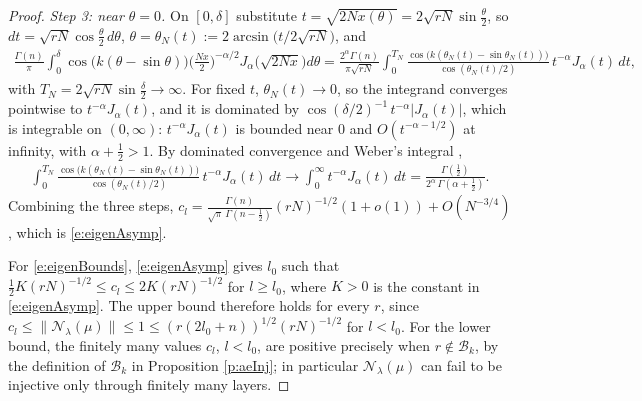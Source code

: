 \documentclass[11pt]{amsart}
\theoremstyle{plain}
\theoremstyle{definition}
\theoremstyle{remark}
\numberwithin{equation}{section}
\def\cB{\mathcal{B}}
\def\cN{\mathcal{N}}
\numberwithin{equation}{section}
\begin{document}
\begin{proof}
	\textit{Step 3: near $\theta=0$.} On $[0, \delta]$ substitute $t=\sqrt{2Nx(\theta)}=2\sqrt{rN}\sin\tfrac{\theta}{2}$, so $dt=\sqrt{rN}\cos\tfrac{\theta}{2}\,d\theta$, $\theta=\theta_N(t):=2\arcsin\big(t/2\sqrt{rN}\big)$, and
	\begin{align*}
		\frac{\Gamma(n)}{\pi}\int_0^{\delta}\cos\big(k(\theta-\sin\theta)\big)\big(\tfrac{Nx}{2}\big)^{-\alpha/2}J_\alpha\big(\sqrt{2Nx}\big)d\theta=\frac{2^\alpha\Gamma(n)}{\pi\sqrt{rN}}\int_0^{T_N}\frac{\cos\big(k(\theta_N(t)-\sin\theta_N(t))\big)}{\cos(\theta_N(t)/2)}\,t^{-\alpha}J_\alpha(t)\,dt,
	\end{align*}
	with $T_N=2\sqrt{rN}\sin\tfrac{\delta}{2}\to\infty$. For fixed $t$, $\theta_N(t)\to0$, so the integrand converges pointwise to $t^{-\alpha}J_\alpha(t)$, and it is dominated by $\cos(\delta/2)^{-1}\,t^{-\alpha}|J_\alpha(t)|$, which is integrable on $(0, \infty)$: $t^{-\alpha}J_\alpha(t)$ is bounded near $0$ and $O(t^{-\alpha-1/2})$ at infinity, with $\alpha+\tfrac12>1$. By dominated convergence and Weber's integral \cite[Eq. 10.22.43]{DLMF},
	\begin{align*}
		\int_0^{T_N}\frac{\cos\big(k(\theta_N(t)-\sin\theta_N(t))\big)}{\cos(\theta_N(t)/2)}\,t^{-\alpha}J_\alpha(t)\,dt\longrightarrow\int_0^\infty t^{-\alpha}J_\alpha(t)\,dt=\frac{\Gamma(\tfrac12)}{2^\alpha\,\Gamma(\alpha+\tfrac12)}.
	\end{align*}
	Combining the three steps, $c_l=\frac{\Gamma(n)}{\sqrt\pi\,\Gamma(n-\frac12)}(rN)^{-1/2}(1+o(1))+O(N^{-3/4})$, which is \eqref{e:eigenAsymp}.

	For \eqref{e:eigenBounds}, \eqref{e:eigenAsymp} gives $l_0$ such that $\tfrac12K(rN)^{-1/2}\leq c_l\leq 2K(rN)^{-1/2}$ for $l\geq l_0$, where $K>0$ is the constant in \eqref{e:eigenAsymp}. The upper bound therefore holds for every $r$, since $c_l\leq\|\cN_\lambda(\mu)\|\leq1\leq(r(2l_0+n))^{1/2}(rN)^{-1/2}$ for $l<l_0$. For the lower bound, the finitely many values $c_l$, $l<l_0$, are positive precisely when $r\notin\cB_k$, by the definition of $\cB_k$ in Proposition \ref{p:aeInj}; in particular $\cN_\lambda(\mu)$ can fail to be injective only through finitely many layers.
\end{proof}
\end{document}
